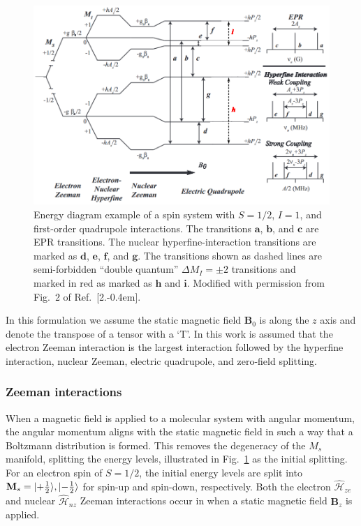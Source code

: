 \begin{figure}[ht]
 \centering
 \includegraphics[width=\textwidth]{Kapitel/Ch2-Images/EnergyDiagram.eps}
 \caption[Energy diagram example with S=1/2 and I=1.]{Energy diagram example of a spin system with $S=1/2$, $I=1$, and first-order quadrupole interactions. The transitions $\mathbf{a}$, $\mathbf{b}$, and $\mathbf{c}$ are EPR transitions. The nuclear hyperfine-interaction transitions are marked as $\mathbf{d}$, $\mathbf{e}$, $\mathbf{f}$, and $\mathbf{g}$. The transitions shown as dashed lines are semi-forbidden ``double quantum'' $\Delta M_I = \pm 2$ transitions and marked in red as marked as $\mathbf{h}$ and $\mathbf{i}$. Modified with permission from Fig.~2 of Ref.~[2.\kern-0.4em].}
 \label{fig:EPREnergy}
\end{figure}

In this formulation we assume the static magnetic field $\mathbf{B}_0$ is along the $z$ axis and denote the transpose of a tensor with a `T'. In this work is assumed that the electron Zeeman interaction is the largest interaction followed by the hyperfine interaction, nuclear Zeeman, electric quadrupole, and zero-field splitting.

\subsubsection*{Zeeman interactions}
When a magnetic field is applied to a molecular system with angular momentum, the angular momentum aligns with the static magnetic field in such a way that a Boltzmann distribution is formed. This removes the degeneracy of the $M_s$ manifold, splitting the energy levels, illustrated in Fig.~\ref{fig:EPREnergy} as the initial splitting. For an electron spin of $S = 1/2$, the initial energy levels are split into $\mathbf{M}_s = \lvert+\frac{1}{2}\rangle, \lvert-\frac{1}{2}\rangle$ for spin-up and spin-down, respectively. Both the electron $\hat{\mathcal{H}}_{ze}$ and nuclear $\hat{\mathcal{H}}_{nz}$ Zeeman interactions occur in when a static magnetic field $\mathbf{B}_z$ is applied.


